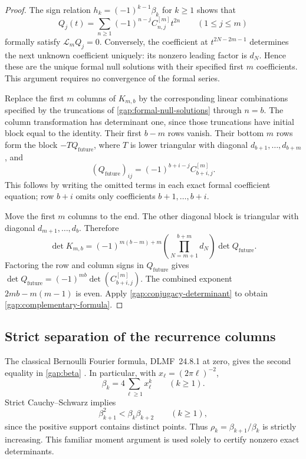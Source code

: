 \documentclass[11pt,letterpaper]{article}
\numberwithin{equation}{section}
\theoremstyle{plain}
\theoremstyle{definition}
\theoremstyle{remark}
\begin{document}
\begin{proof}
The sign relation $h_k=(-1)^{k-1}\beta_k$ for $k\ge1$ shows that
\begin{equation}\label{gap:formal-null-solutions}
 Q_j(t)=\sum_{n\ge1}(-1)^{n-j}C_{n,j}^{[m]}t^{2n}
 \qquad(1\le j\le m)
\end{equation}
formally satisfy $\mathcal L_mQ_j=0$. Conversely, the coefficient
at $t^{2N-2m-1}$ determines the next unknown coefficient uniquely:
its nonzero leading factor is $d_N$. Hence these are the unique
formal null solutions with their specified first $m$ coefficients.
This argument requires no convergence of the formal series.

Replace the first $m$ columns of $K_{m,b}$ by the corresponding
linear combinations specified by the truncations of
\eqref{gap:formal-null-solutions} through $n=b$. The column
transformation has determinant one, since those truncations have
initial block equal to the identity. Their first $b-m$ rows vanish.
Their bottom $m$ rows form the block $-TQ_{\mathrm{future}}$, where
$T$ is lower triangular with diagonal $d_{b+1},\ldots,d_{b+m}$,
and
\[
 (Q_{\mathrm{future}})_{ij}
      =(-1)^{b+i-j}C_{b+i,j}^{[m]}.
\]
This follows by writing the omitted terms in each exact formal
coefficient equation; row $b+i$ omits only coefficients
$b+1,\ldots,b+i$.

Move the first $m$ columns to the end. The other diagonal block is
triangular with diagonal $d_{m+1},\ldots,d_b$. Therefore
\[
 \det K_{m,b}
 =(-1)^{m(b-m)+m}\left(\prod_{N=m+1}^{b+m}d_N\right)
                          \det Q_{\mathrm{future}}.
\]
Factoring the row and column signs in $Q_{\mathrm{future}}$
gives $\det Q_{\mathrm{future}}=(-1)^{mb}
\det(C_{b+i,j}^{[m]})$. The combined exponent
$2mb-m(m-1)$ is even. Apply
\eqref{gap:conjugacy-determinant} to obtain
\eqref{gap:complementary-formula}.
\end{proof}

\subsection{Strict separation of the recurrence columns}

The classical Bernoulli Fourier formula, DLMF~24.8.1 at zero,
gives the second equality in \eqref{gap:beta} \cite{DLMF}. In particular, with
$x_\ell=(2\pi\ell)^{-2}$,
\[
 \beta_k=4\sum_{\ell\ge1}x_\ell^k\qquad(k\ge1).
\]
Strict Cauchy--Schwarz implies
\begin{equation}\label{gap:strict-log-convexity}
 \beta_{k+1}^2<\beta_k\beta_{k+2}\qquad(k\ge1),
\end{equation}
since the positive support contains distinct points. Thus
$\rho_k=\beta_{k+1}/\beta_k$ is strictly increasing. This familiar
moment argument is used solely to certify nonzero exact determinants.
\end{document}
